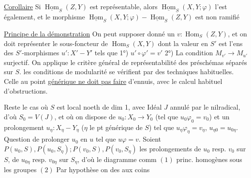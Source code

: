 \uline{Corollaire} Si $\underline{\operatorname{Hom}}_S(Z,Y)$ est représentable, alors $\underline{\operatorname{Hom}}_S(X,Y;\varphi)$ l'est également, et le morphisme $\underline{\operatorname{Hom}}_S(X,Y;\varphi)-\underline{\operatorname{Hom}}_S(Z,Y)$ est non ramifié

\uline{Principe de la démonstration} On peut supposer donné un $v:\operatorname{Hom}_S(Z,Y)$, et on doit représenter le sous-foncteur de $\operatorname{Hom}_S(X,Y)$ dont la valeur en $S'$ est l'ens des $S'$-morphismes $u':X'-Y'$ tels que 1°) $u'\circ\varphi'=v'$ 2°) La condition $M_{v'}\longrightarrow M_{u'}$ surjectif. On applique le critère général de représentabilité  des 
préschémas   séparés sur $S$.  les  conditions de modularité se vérifient par des techniques habituelles.  Celle au point \uline{générique ne doit pas faire} d'ennuis, avec le calcul habituel d'obstructions.

Reste le cas où $S$ est local noeth  de dim 1, avec Idéal $J$ annulé par le nilradical, d'où $S_0=V(J)$, et où on dispose de $u_0:X_0\longrightarrow Y_0$ (tel que $u_0\varphi_0=v_0$) et un prolongement $u_\eta:X_\eta-Y_\eta$ ($\eta$ le pt générique de $S$) tel que $u_\eta\varphi_\eta=v_\eta$, $u_{\eta0}=u_{0\eta}$. Question de prolonger $u_0$ en $u$ tel que $u\varphi=v$.  Soient $P(u_0,S),P(u_0,S_\eta);P(v_0,S),P(v_0,S_\eta)$ les prolongements de $u_0$ resp. $v_0$ sur $S$,  de $u_{0\eta}$ resp. $v_{0\eta}$ sur $S_\eta$, d'où le diagramme comm
 $(1)$
  princ. homogènes sous les groupes
 $(2)$
Par hypothèse on  des  aux coins
